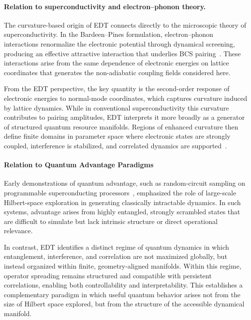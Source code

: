 \documentclass[twocolumn,10pt]{article}
\begin{document}
\paragraph*{Relation to superconductivity and electron--phonon theory.}

The curvature-based origin of EDT connects directly to the microscopic theory of superconductivity. In the Bardeen--Pines formulation, electron--phonon interactions renormalize the electronic potential through dynamical screening, producing an effective attractive interaction that underlies BCS pairing~\cite{BardeenPines1955,BCS1957}. These interactions arise from the same dependence of electronic energies on lattice coordinates that generates the non-adiabatic coupling fields considered here.

From the EDT perspective, the key quantity is the second-order response of electronic energies to normal-mode coordinates, which captures curvature induced by lattice dynamics. While in conventional superconductivity this curvature contributes to pairing amplitudes, EDT interprets it more broadly as a generator of structured quantum resource manifolds. Regions of enhanced curvature then define finite domains in parameter space where electronic states are strongly coupled, interference is stabilized, and correlated dynamics are supported~\cite{Giustino2017}.

\paragraph*{Relation to Quantum Advantage Paradigms}

Early demonstrations of quantum advantage, such as random-circuit sampling on programmable superconducting processors~\cite{Arute2019}, emphasized the role of large-scale Hilbert-space exploration in generating classically intractable dynamics. In such systems, advantage arises from highly entangled, strongly scrambled states that are difficult to simulate but lack intrinsic structure or direct operational relevance.

In contrast, EDT identifies a distinct regime of quantum dynamics in which entanglement, interference, and correlation are not maximized globally, but instead organized within finite, geometry-aligned manifolds. Within this regime, operator spreading remains structured and compatible with persistent correlations, enabling both controllability and interpretability. This establishes a complementary paradigm in which useful quantum behavior arises not from the size of Hilbert space explored, but from the structure of the accessible dynamical manifold.
\end{document}
